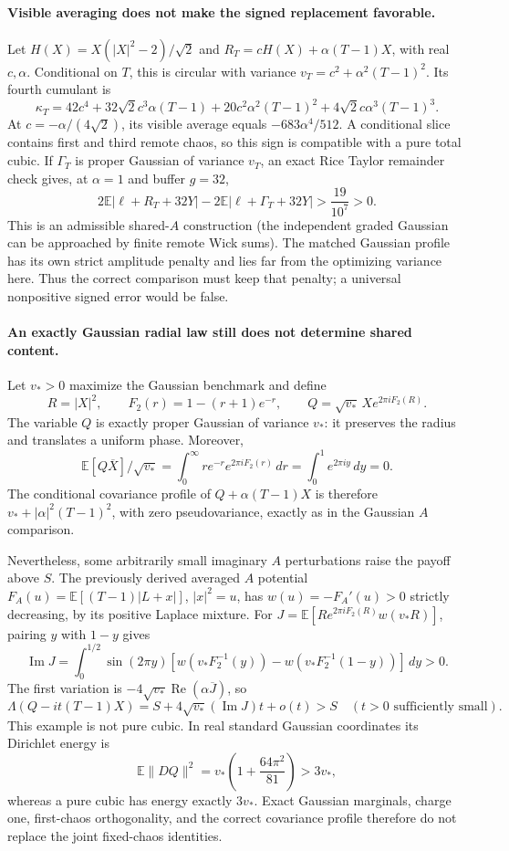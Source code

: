 \paragraph{Visible averaging does not make the signed replacement favorable.}
Let $H(X)=X(|X|^2-2)/\sqrt2$ and
$R_T=cH(X)+\alpha(T-1)X$, with real $c,\alpha$.  Conditional on $T$, this is
circular with variance $v_T=c^2+\alpha^2(T-1)^2$.  Its fourth cumulant is
\[
 \kappa_T=42c^4+32\sqrt2c^3\alpha(T-1)
     +20c^2\alpha^2(T-1)^2+4\sqrt2c\alpha^3(T-1)^3.
\]
At $c=-\alpha/(4\sqrt2)$, its visible average equals
$-683\alpha^4/512$.  A conditional slice contains first and third remote
chaos, so this sign is compatible with a pure total cubic.
If $\Gamma_T$ is proper Gaussian of variance $v_T$, an exact Rice Taylor
remainder check gives, at $\alpha=1$ and buffer $g=32$,
\[
 2\mathbb E|\ell+R_T+32Y|
 -2\mathbb E|\ell+\Gamma_T+32Y|>\frac{19}{10^7}>0.
\]
This is an admissible shared-$A$ construction (the independent graded
Gaussian can be approached by finite remote Wick sums).  The matched
Gaussian profile has its own strict amplitude penalty and lies far from
the optimizing variance here.  Thus the correct comparison must keep that
penalty; a universal nonpositive signed error would be false.

\paragraph{An exactly Gaussian radial law still does not determine shared content.}
Let $v_*>0$ maximize the Gaussian benchmark and define
\[
 R=|X|^2,\qquad F_2(r)=1-(r+1)e^{-r},\qquad
 Q=\sqrt{v_*}\,X e^{2\pi iF_2(R)}.
\]
The variable $Q$ is exactly proper Gaussian of variance $v_*$: it preserves
the radius and translates a uniform phase.  Moreover,
\[
 \mathbb E[Q\overline X]/\sqrt{v_*}
 =\int_0^\infty re^{-r}e^{2\pi iF_2(r)}\,dr
 =\int_0^1e^{2\pi iy}\,dy=0.
\]
The conditional covariance profile of $Q+\alpha(T-1)X$ is therefore
$v_*+|\alpha|^2(T-1)^2$, with zero pseudovariance, exactly as in the
Gaussian $A$ comparison.

Nevertheless, some arbitrarily small imaginary $A$ perturbations raise
the payoff above $S$.  The previously derived averaged $A$ potential
$F_A(u)=\mathbb E[(T-1)|L+x|]$, $|x|^2=u$, has
$w(u)=-F_A'(u)>0$ strictly decreasing, by its positive Laplace mixture.
For
$J=\mathbb E[R e^{2\pi iF_2(R)}w(v_*R)]$, pairing $y$ with $1-y$ gives
\[
 \operatorname{Im}J=\int_0^{1/2}\sin(2\pi y)
  [w(v_*F_2^{-1}(y))-w(v_*F_2^{-1}(1-y))]\,dy>0.
\]
The first variation is
$-4\sqrt{v_*}\operatorname{Re}(\alpha\overline J)$, so
\[
 \Lambda(Q-it(T-1)X)=S+4\sqrt{v_*}(\operatorname{Im}J)t+o(t)>S
 \quad(t>0\text{ sufficiently small}).
\]
This example is not pure cubic.  In real standard Gaussian coordinates its
Dirichlet energy is
\[
 \mathbb E\|DQ\|^2=v_*\left(1+\frac{64\pi^2}{81}\right)>3v_*,
\]
whereas a pure cubic has energy exactly $3v_*$.  Exact Gaussian marginals,
charge one, first-chaos orthogonality, and the correct covariance profile
therefore do not replace the joint fixed-chaos identities.

